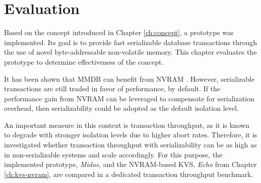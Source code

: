 \chapter{Evaluation}
\label{ch:eval}



Based on the concept introduced in Chapter \ref{ch:concept}, a prototype was
implemented. Its goal is to provide fast serializable database transactions
through the use of novel byte-addressable non-volatile memory. This chapter
evaluates the prototype to determine effectiveness of the concept.

It has been shown that MMDB can benefit from NVRAM \cite{bailey2013exploring,
schwalb2016hyrise, oukid2017data, andrei2017sap}. However, serializable
transactions are still traded in favor of performance, by default. If the
performance gain from NVRAM can be leveraged to compensate for serialization
overhead, then serializability could be adopted as the default isolation level.


An important measure in this context is transaction throughput, as it is known
to degrade with stronger isolation levels due to higher abort rates. Therefore,
it is investigated whether transaction throughput with serializability can be as
high as in non-serializable systems and scale accordingly. For this purpose, the
implemented prototype, \emph{Midas}, and the NVRAM-based KVS, \emph{Echo} from
Chapter \ref{ch:kvs-nvram}, are compared in a dedicated transaction throughput
benchmark.



